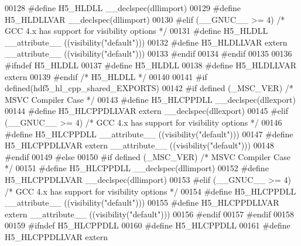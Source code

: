 \begin{DoxyCode}
00128 \textcolor{preprocessor}{    #define H5\_HLDLL \_\_declspec(dllimport)}
00129 \textcolor{preprocessor}{    #define H5\_HLDLLVAR \_\_declspec(dllimport)}
00130 \textcolor{preprocessor}{  #elif (\_\_GNUC\_\_ >= 4)  }\textcolor{comment}{/* GCC 4.x has support for visibility options */}\textcolor{preprocessor}{}
00131 \textcolor{preprocessor}{    #define H5\_HLDLL \_\_attribute\_\_ ((visibility("default")))}
00132 \textcolor{preprocessor}{    #define H5\_HLDLLVAR extern \_\_attribute\_\_ ((visibility("default")))}
00133 \textcolor{preprocessor}{  #endif}
00134 \textcolor{preprocessor}{#endif}
00135 
00136 \textcolor{preprocessor}{#ifndef H5\_HLDLL}
00137 \textcolor{preprocessor}{  #define H5\_HLDLL}
00138 \textcolor{preprocessor}{  #define H5\_HLDLLVAR extern}
00139 \textcolor{preprocessor}{#endif }\textcolor{comment}{/* H5\_HLDLL */}\textcolor{preprocessor}{}
00140 
00141 \textcolor{preprocessor}{#if defined(hdf5\_hl\_cpp\_shared\_EXPORTS)}
00142 \textcolor{preprocessor}{  #if defined (\_MSC\_VER)  }\textcolor{comment}{/* MSVC Compiler Case */}\textcolor{preprocessor}{}
00143 \textcolor{preprocessor}{    #define H5\_HLCPPDLL \_\_declspec(dllexport)}
00144 \textcolor{preprocessor}{    #define H5\_HLCPPDLLVAR extern \_\_declspec(dllexport)}
00145 \textcolor{preprocessor}{  #elif (\_\_GNUC\_\_ >= 4)  }\textcolor{comment}{/* GCC 4.x has support for visibility options */}\textcolor{preprocessor}{}
00146 \textcolor{preprocessor}{    #define H5\_HLCPPDLL \_\_attribute\_\_ ((visibility("default")))}
00147 \textcolor{preprocessor}{    #define H5\_HLCPPDLLVAR extern \_\_attribute\_\_ ((visibility("default")))}
00148 \textcolor{preprocessor}{  #endif}
00149 \textcolor{preprocessor}{#else}
00150 \textcolor{preprocessor}{  #if defined (\_MSC\_VER)  }\textcolor{comment}{/* MSVC Compiler Case */}\textcolor{preprocessor}{}
00151 \textcolor{preprocessor}{    #define H5\_HLCPPDLL \_\_declspec(dllimport)}
00152 \textcolor{preprocessor}{    #define H5\_HLCPPDLLVAR \_\_declspec(dllimport)}
00153 \textcolor{preprocessor}{  #elif (\_\_GNUC\_\_ >= 4)  }\textcolor{comment}{/* GCC 4.x has support for visibility options */}\textcolor{preprocessor}{}
00154 \textcolor{preprocessor}{    #define H5\_HLCPPDLL \_\_attribute\_\_ ((visibility("default")))}
00155 \textcolor{preprocessor}{    #define H5\_HLCPPDLLVAR extern \_\_attribute\_\_ ((visibility("default")))}
00156 \textcolor{preprocessor}{  #endif}
00157 \textcolor{preprocessor}{#endif}
00158 
00159 \textcolor{preprocessor}{#ifndef H5\_HLCPPDLL}
00160 \textcolor{preprocessor}{  #define H5\_HLCPPDLL}
00161 \textcolor{preprocessor}{  #define H5\_HLCPPDLLVAR extern}

\end{DoxyCode}
